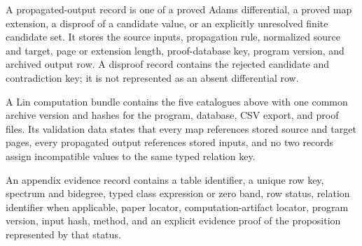 \begin{definition}
  \label{def:lin-propagated-output-record}
  \notready
  A propagated-output record is one of a proved Adams differential, a proved
  map extension, a disproof of a candidate value, or an explicitly unresolved
  finite candidate set.  It stores the source inputs, propagation rule,
  normalized source and target, page or extension length, proof-database key,
  program version, and archived output row.  A disproof record contains the
  rejected candidate and contradiction key; it is not represented as an absent
  differential row.
\end{definition}

\begin{definition}
  \label{def:lin-computation-bundle}
  \notready
  A Lin computation bundle contains the five catalogues above with one common
  archive version and hashes for the program, database, CSV export, and proof
  files.  Its validation data states that every map references stored source
  and target pages, every propagated output references stored inputs, and no
  two records assign incompatible values to the same typed relation key.
\end{definition}

\begin{definition}
  \label{def:appendix-evidence-record}
  \notready
  An appendix evidence record contains a table identifier, a unique row key,
  spectrum and bidegree, typed class expression or zero band, row status,
  relation identifier when applicable, paper locator, computation-artifact
  locator, program version, input hash, method, and an explicit evidence proof
  of the proposition represented by that status.
\end{definition}

